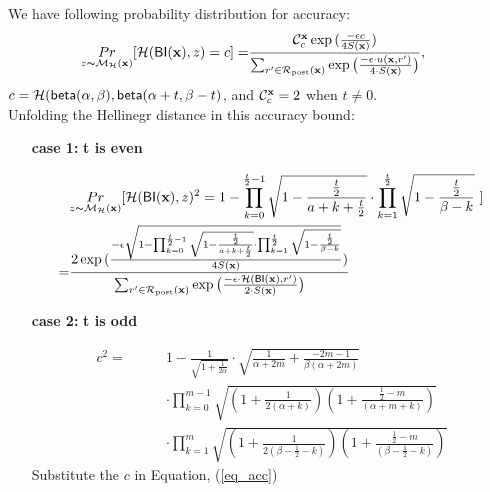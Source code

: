 \documentclass{article}
\begin{document}
  We have following probability distribution for accuracy:
  \begin{align}
  \label{eq_acc}
  \underset{z \thicksim \mathcal{M}_{\mathcal{H}}(\textbf{x})}{Pr}[\mathcal{H}(\mathsf{BI}(\textbf{x}), z) = c] 
  = & \frac{\mathcal{C}^{\textbf{x}}_{c} \exp{(\frac{- \epsilon c}{4 S(\textbf{x})})}}{\sum_{r'\in \mathcal{R}_{\textup{post}}(\textbf{x})} \exp \big(\frac{-\epsilon\cdot u(\textbf{\textbf{x}}, r')}{4 \cdot S(\textbf{x})}\big)},
  \end{align}
  $c = \mathcal{H}(\mathsf{beta}(\alpha, \beta), \mathsf{beta}(\alpha + t, \beta - t)$, and $\mathcal{C}^{\textbf{x}}_{c} = 2$ when $t \neq 0$.\\
  Unfolding the Hellinegr distance in this accuracy bound:

 \begin{itemize}

  \item[\textbf{case 1:}] \textbf{t is even}

  \begin{align*}
  &\underset{z \thicksim \mathcal{M}_{\mathcal{H}}(\textbf{x})}{Pr}[\mathcal{H}(\mathsf{BI}(\textbf{x}), z)^2 = 
  1 - \prod_{k = 0}^{\frac{t}{2} - 1}
  \sqrt{1 - \frac{\frac{t}{2}}{a + k + \frac{t}{2}}}
  \cdot
  \prod_{k = 1}^{\frac{t}{2}}
  \sqrt{1 - \frac{\frac{t}{2}}{\beta - k}}\ ]\\
  = & \frac{2 \exp{(\frac{- \epsilon \sqrt{1 - \prod_{k = 0}^{\frac{t}{2} - 1}
  \sqrt{1 - \frac{\frac{t}{2}}{a + k + \frac{t}{2}}}
  \cdot
  \prod_{k = 1}^{\frac{t}{2}}
  \sqrt{1 - \frac{\frac{t}{2}}{\beta - k}}}}{4 S(\textbf{x})})}}
  {\sum_{r'\in \mathcal{R}_{\textup{post}}(\textbf{x})} \exp \big(\frac{-\epsilon\cdot \mathcal{H} (\mathsf{BI}(\textbf{x}),r')}{2 \cdot S(\textbf{x})}\big)}
  \end{align*}


  \item[\textbf{case 2:}] \textbf{t is odd}

  \begin{align*}
  c^2 = \qquad &
  1 - \frac{1}{\sqrt{1 + \frac{1}{2\alpha}}} \cdot 
  \sqrt{\frac{1}{\alpha + 2m} + \frac{- 2m - 1}{\beta(\alpha + 2m)}} \\
  \qquad &\cdot 
  \prod_{k = 0}^{m-1}
  \sqrt{(1 + \frac{1}{2(\alpha + k)})
  (1 + \frac{\frac{1}{2} - m}{(\alpha + m  + k)})
  } \\
  \qquad & \cdot 
  \prod_{k = 1}^{m} 
  \sqrt{(1 + \frac{1}{2(\beta - \frac{1}{2}- k)})(1 + \frac{\frac{1}{2} - m}{(\beta - \frac{1}{2}- k)})}
  \end{align*}
  Substitute the $c$ in Equation, (\ref{eq_acc})

\end{itemize}






\end{document}

